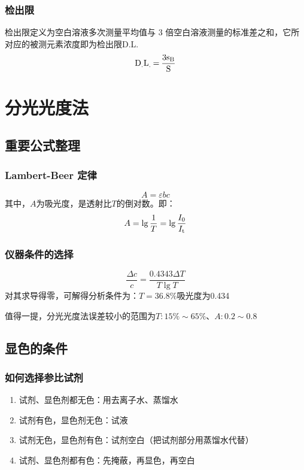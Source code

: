 \documentclass[UTF8,AutoFakeBold,b5paper]{ctexbook}
\begin{document}
\subsubsection{检出限}
检出限定义为\textcolor[rgb]{0.54,0.13,0.33}{空白溶液多次测量平均值与 3 倍空白溶液测量的标准差之和，它所对应的被测元素浓度即为检出限D.L.}
\begin{equation}
	\ce{D_{.}L_{.} = \dfrac{3s_{\ce{B}}}{S}}
\end{equation}

\section{分光光度法}
\subsection{重要公式整理}
\subsubsection{Lambert-Beer 定律}
\begin{equation}
	A = \varepsilon b c
\end{equation}
其中，$A$为吸光度，是透射比$T$的倒对数。即：
\begin{equation}
	A = \lg \dfrac{1}{T} = \lg{\dfrac{I_{0}}{I_{\ce{t}}}}
\end{equation}
\subsubsection{仪器条件的选择}
\textcolor[rgb]{0.54,0.13,0.33}{\begin{equation}
	\dfrac{\Delta c}{c} = \dfrac{0.4343\Delta T}{T\lg{T}}
\end{equation}
}
对其求导得零，可解得分析条件为：\textcolor[rgb]{0.54,0.13,0.33}{$T = 36.8\%$吸光度为0.434}

值得一提，分光光度法误差较小的范围为$T:15\%\sim 65\%$、$A:0.2\sim 0.8$
\subsection{显色的条件}
\subsubsection{如何选择参比试剂}
\begin{enumerate}
	\item 试剂、显色剂都无色：用去离子水、蒸馏水
	\item 试剂有色，显色剂无色：试液
	\item 试剂无色，显色剂有色：试剂空白（把试剂部分用蒸馏水代替）
	\item 试剂、显色剂都有色：先掩蔽，再显色，再空白
\end{enumerate}
\end{document}
